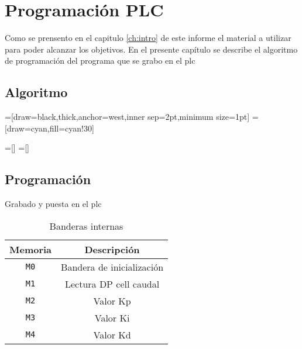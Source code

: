 \chapter{Programación PLC}
\label{ch:progPLC}
Como se prensento en el capitulo \ref{ch:intro} de este informe el material a utilizar
para poder alcanzar los objetivos. En el presente capítulo se describe el algoritmo 
de programación del programa que se grabo en el \gls{plc}
\section{Algoritmo}
\label{sec:Algoritmo}



\usetikzlibrary{trees}
=[draw=black,thick,anchor=west,inner sep=2pt,minimum size=1pt]
=[draw=cyan,fill=cyan!30]
=[] %
=[] %






\section{Programación}
\label{sec:Programacion}
Grabado y puesta en el plc

\begin{table}[!t]

\renewcommand{\arraystretch}{1.3}
\centering
\begin{tabular}{c||c}
\hline
\bfseries Memoria & \bfseries Descripción\\
\hline \hline
\verb|M0|  & Bandera de inicialización\\
\verb|M1|  & Lectura DP cell caudal\\
\verb|M2|  & Valor Kp\\
\verb|M3|  & Valor Ki\\
\verb|M4|  & Valor Kd\\
\hline
\end{tabular}
\caption{Banderas internas}
\end{table}


